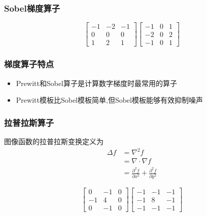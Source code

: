 \documentclass{beamer}
\begin{document}
\begin{frame}
\frametitle{Sobel梯度算子}
\label{sec-2-10}

       \[\begin{bmatrix}
           -1 & -2 & -1 \\
            0 &  0 &  0 \\
            1 &  2 &  1 \end{bmatrix}
           \begin{bmatrix}
           -1 &  0 &  1 \\
           -2 &  0 &  2 \\
           -1 &  0 &  1 \end{bmatrix}\]
\end{frame}
\begin{frame}
\frametitle{梯度算子特点}
\label{sec-2-11}

\begin{itemize}
\item Prewitt和Sobel算子是计算数字梯度时最常用的算子
\item Prewitt模板比Sobel模板简单,但Sobel模板能够有效抑制噪声
\end{itemize}
\end{frame}
\begin{frame}
\frametitle{拉普拉斯算子}
\label{sec-2-12}

  图像函数的拉普拉斯变换定义为
\begin{align*}
\Delta f &=\nabla^2 f \\
         &= \nabla\cdot\nabla f\\ 
         &=\frac{\partial^2 f}{\partial x^2} +\frac{\partial^2 f}{\partial y^2} 
\end{align*}

       \[\begin{bmatrix}
            0 & -1 &  0 \\
           -1 &  4 &  0 \\
            0 & -1 &  0 \end{bmatrix}
           \begin{bmatrix}
           -1 &  -1 &  -1 \\
           -1 &  8  &  -1 \\
           -1 &  -1 &  -1 \end{bmatrix}\]
\end{frame}
\end{document}
